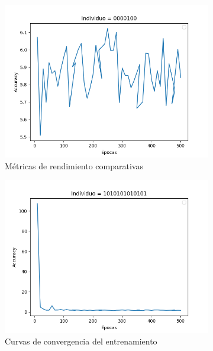 \begin{figure}[!ht]
\centering
\begin{subfigure}[b]{0.32\textwidth}
    \includegraphics[width=\textwidth]{images/Figure_3.png}
    \caption{Métricas de rendimiento comparativas}
    \label{fig:metricas_rendimiento}
\end{subfigure}
\hfill
\begin{subfigure}[b]{0.32\textwidth}
    \includegraphics[width=\textwidth]{images/Figure_4.png}
    \caption{Curvas de convergencia del entrenamiento}
    \label{fig:curvas_aprendizaje}
\end{subfigure}
\hfill
\begin{subfigure}[b]{0.32\textwidth}

\end{subfigure}
\end{figure}
